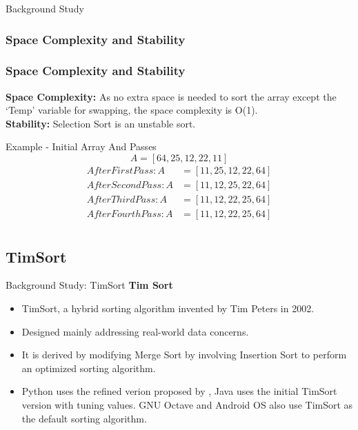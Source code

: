 \documentclass[aspectratio=169]{beamer}
\begin{document}
  \begin{frame}{Background Study}
  \frametitle{Space Complexity and Stability}
\subsubsection{Space Complexity and Stability}

\textbf{Space Complexity:} As no extra space is needed to sort the array except the ‘Temp’ variable for swapping, the space complexity is O(1).\\  
\vspace{.2cm}
\textbf{Stability:} Selection Sort is an unstable sort.

  \end{frame}


\begin{frame}{Example - Initial Array And Passes}
  \[ A = [64, 25, 12, 22, 11] \]
  \begin{align*}
      After First Pass:  A &= [11, 25, 12, 22, 64] \\
      After Second Pass: A &= [11, 12, 25, 22, 64] \\
      After Third Pass:  A &= [11, 12, 22, 25, 64] \\
      After Fourth Pass: A &= [11, 12, 22, 25, 64] \\
  \end{align*}
\end{frame}

  
   \subsection{TimSort}
  \begin{frame}{Background Study: TimSort}
      \textbf{\fontsize{13}{13}\selectfont Tim Sort}\newline
   
    
      \begin{itemize}
          \item TimSort, a hybrid sorting algorithm invented by Tim Peters in 2002\citep{peters2015TimSort}.
          \item Designed mainly addressing real-world data concerns.
          \item It is derived by modifying Merge Sort\citep{Knuth-Merge} by involving Insertion Sort\citep{Knuth-StInsertion} to perform an optimized sorting algorithm.
          \item Python uses the refined verion proposed by \citet{gouw-java}, Java uses the initial TimSort version with tuning values\citep{Auger-2019}. GNU Octave and Android OS  also use TimSort as the default sorting algorithm.
      \end{itemize}

  \end{frame}
  
\end{document}
